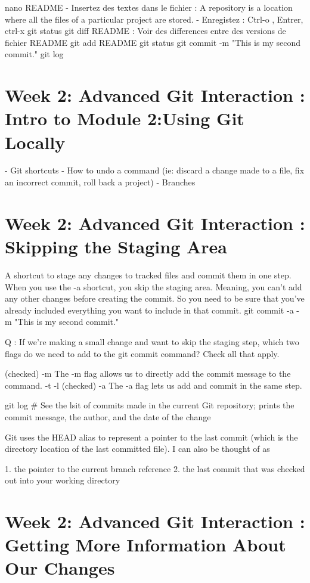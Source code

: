 \documentclass[11pt, onecolumn]{article}
\begin{document}
nano README
- Insertez des textes dans le fichier : A repository is a location where all the files of a particular project are stored.
- Enregistez : Ctrl-o , Entrer, ctrl-x
git status
git diff README : Voir des differences entre des versions de fichier README
git add README
git status
git commit -m "This is my second commit."
git log


\section{Week 2: Advanced Git Interaction : Intro to Module 2:Using Git Locally}

- Git shortcuts
- How to undo a command (ie: discard a change made to a file, fix an incorrect commit, roll back a project)
- Branches


\section{Week 2: Advanced Git Interaction : Skipping the Staging Area}

A shortcut to stage any changes to tracked files and commit them in one step. 
When you use the -a shortcut, you skip the staging area. Meaning, you can't add any other changes before creating the commit. So you need to be sure that you've already included everything you want to include in that commit. 
git commit -a -m "This is my second commit."


Q : If we're making a small change and want to skip the staging step, which two flags do we need to add to the git commit command? Check all that apply.

(checked) -m  The -m flag allows us to directly add the commit message to the command.
-t
-l
(checked) -a  The -a flag lets us add and commit in the same step.

git log   # See the lsit of commits made in the current Git repository; prints the commit message, the author, and the date of the change

Git uses the HEAD alias to represent a pointer to the last commit (which is the directory location of the last committed file). I can also be thought of as 

1. the pointer to the current branch reference
2. the last commit that was checked out into your working directory


\section{Week 2: Advanced Git Interaction : Getting More Information About Our Changes}
\end{document}
